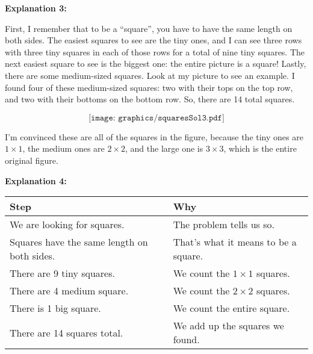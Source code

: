 \documentclass[nooutcomes, handout]{ximera}
\begin{document}
\begin{mdframed}
{\bf Explanation 3:}

First, I remember that to be a ``square'', you have to have the same length on both sides.  The easiest squares to see are the tiny ones, and I can see three rows with three tiny squares in each of those rows for a total of nine tiny squares.  The next easiest square to see is the biggest one: the entire picture is a square!  Lastly, there are some medium-sized squares.  Look at my picture to see an example.  I found four of these medium-sized squares: two with their tops on the top row, and two with their bottoms on the bottom row.  So, there are 14 total squares.

\[
\texttt{[image: graphics/squaresSol3.pdf]}
\]

I'm convinced these are all of the squares in the figure, because the tiny ones are $1\times 1$, the medium ones are $2 \times 2$, and the large one is $3\times 3$, which is the entire original figure.
\end{mdframed}

\begin{mdframed}
{\bf Explanation 4:}

\begin{tabularx}{\textwidth}{X|X}
    Step & Why  \\ \hline \hline
    We are looking for squares. & The problem tells us so. \\ \hline
    Squares have the same length on both sides. & That's what it means to be a square. \\ \hline
    There are 9 tiny squares. & We count the $1\times 1$ squares. \\ \hline
    There are 4 medium square. & We count the $2 \times 2$ squares. \\ \hline
    There is 1 big square. & We count the entire square. \\ \hline
    There are 14 squares total. & We add up the squares we found. \\
\end{tabularx}
\end{mdframed}
\end{document}
